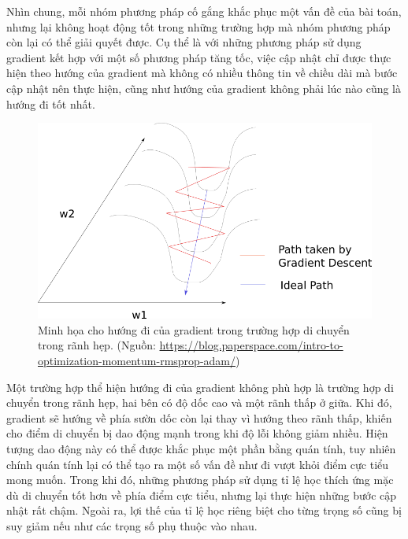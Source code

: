 Nhìn chung, mỗi nhóm phương pháp cố gắng khắc phục một vấn đề của bài toán, nhưng lại không hoạt động tốt trong những trường hợp mà nhóm phương pháp còn lại có thể giải quyết được. Cụ thể là với những phương pháp sử dụng gradient kết hợp với một số phương pháp tăng tốc, việc cập nhật chỉ được thực hiện theo hướng của gradient mà không có nhiều thông tin về chiều dài mà bước cập nhật nên thực hiện, cũng như hướng của gradient không phải lúc nào cũng là hướng đi tốt nhất.

\begin{figure}[htp]
\centering
\includegraphics[width=100 mm]{images/valley.png}
\caption{Minh họa cho hướng đi của gradient trong trường hợp di chuyển trong rãnh hẹp. (Nguồn: \url{https://blog.paperspace.com/intro-to-optimization-momentum-rmsprop-adam/})}
\label{fig:valley}
\end{figure}

Một trường hợp thể hiện hướng đi của gradient không phù hợp là trường hợp di chuyển trong rãnh hẹp, hai bên có độ dốc cao và một rãnh thấp ở giữa. Khi đó, gradient sẽ hướng về phía sườn dốc còn lại thay vì hướng theo rãnh thấp, khiến cho điểm di chuyển bị dao động mạnh trong khi độ lỗi không giảm nhiều. Hiện tượng dao động này có thể được khắc phục một phần bằng quán tính, tuy nhiên chính quán tính lại có thể tạo ra một số vấn đề như đi vượt khỏi điểm cực tiểu mong muốn. Trong khi đó, những phương pháp sử dụng tỉ lệ học thích ứng mặc dù di chuyển tốt hơn về phía điểm cực tiểu, nhưng lại thực hiện những bước cập nhật rất chậm. Ngoài ra, lợi thế của tỉ lệ học riêng biệt cho từng trọng số cũng bị suy giảm nếu như các trọng số phụ thuộc vào nhau.

